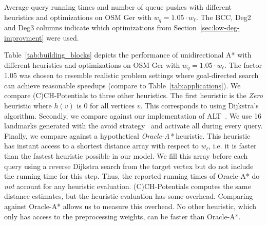 \documentclass[manuscript,review]{acmart}
\begin{document}
\begin{table}
\centering
\caption{
Average query running times and number of queue pushes with different heuristics and optimizations on OSM Ger with $w_q = 1.05 \cdot w_\ell$.
The BCC, Deg2 and Deg3 columns indicate which optimizations from Section~\ref{sec:low-deg-improvment} were used.
}\label{tab:building_blocks}

\end{table}

Table~\ref{tab:building_blocks} depicts the performance of unidirectional A* with different heuristics and optimizations on OSM Ger with $w_q = 1.05 \cdot w_\ell$.
The factor 1.05 was chosen to resemble realistic problem settings where goal-directed search can achieve reasonable speedups (compare to Table~\ref{tab:applications}).
We compare (C)CH-Potentials to three other heuristics.
The first heuristic is the \emph{Zero} heuristic where $h(v)$ is $0$ for all vertices $v$.
This corresponds to using Dijkstra's algorithm.
Secondly, we compare against our implementation of ALT~\cite{gw-cppsp-05}.
We use 16 landmarks generated with the avoid strategy~\cite{gw-cppsp-05} and activate all during every query.
Finally, we compare against a hypothetical \emph{Oracle-A*} heuristic.
This heuristic has instant access to a shortest distance array with respect to $w_\ell$, i.e. it is faster than the fastest heuristic possible in our model.
We fill this array before each query using a reverse Dijkstra search from the target vertex but do not include the running time for this step.
Thus, the reported running times of Oracle-A* do \emph{not} account for any heuristic evaluation.
(C)CH-Potentials computes the same distance estimates, but the heuristic evaluation has some overhead.
Comparing against Oracle-A* allows us to measure this overhead.
No other heuristic, which only has access to the preprocessing weights, can be faster than Oracle-A*.
\end{document}
